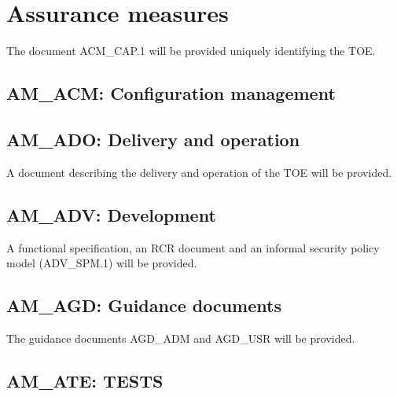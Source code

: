 \documentclass[12pt,english]{scrbook}
\begin{document}


\section{Assurance measures}

The document ACM{\_}CAP.1 will be provided uniquely identifying the TOE.


\subsection{AM{\_}ACM: Configuration management}

\subsection{AM{\_}ADO: Delivery and operation}

A document describing the delivery and operation of the TOE will be provided.




\subsection{AM{\_}ADV: Development}

A functional specification, an RCR document and an informal security policy model
(ADV\_SPM.1) will be provided.




\subsection{AM{\_}AGD: Guidance documents}

The guidance documents AGD{\_}ADM and AGD{\_}USR will be provided.





\subsection{AM{\_}ATE: TESTS}
\end{document}
